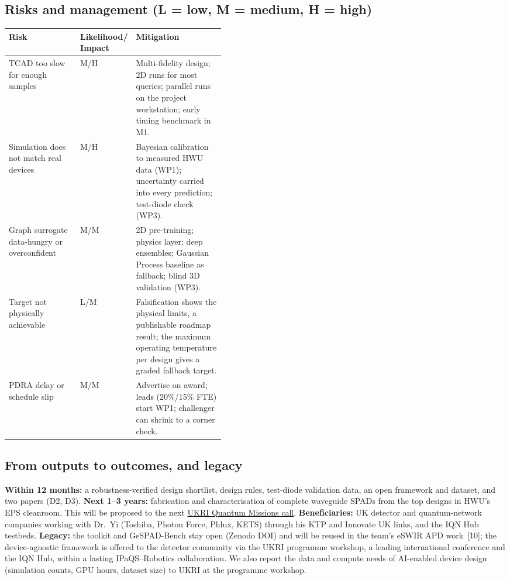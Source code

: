 \documentclass[11pt,a4paper]{article}
\newcommand{\cn}[1]{\textcolor{citeblue}{[#1]}}
\newcommand{\lnk}[2]{\href{#1}{\textcolor{citeblue}{#2}}}
\begin{document}
\subsection{Risks and management (L = low, M = medium, H = high)}
\begin{tabularx}{\linewidth}{@{}p{0.33\linewidth}p{0.095\linewidth}X@{}}\toprule
\small\textbf{Risk} & \small\textbf{Likelihood/ Impact} & \small\textbf{Mitigation}\\\midrule
\small TCAD too slow for enough samples & \small M/H & \small Multi-fidelity design; 2D runs for most queries; parallel runs on the project workstation; early timing benchmark in M1.\\
\small Simulation does not match real devices & \small M/H & \small Bayesian calibration to measured HWU data (WP1); uncertainty carried into every prediction; test-diode check (WP3).\\
\small Graph surrogate data-hungry or overconfident & \small M/M & \small 2D pre-training; physics layer; deep ensembles; Gaussian Process baseline as fallback; blind 3D validation (WP3).\\
\small Target not physically achievable & \small L/M & \small Falsification shows the physical limits, a publishable roadmap result; the maximum operating temperature per design gives a graded fallback target.\\
\small PDRA delay or schedule slip & \small M/M & \small Advertise on award; leads (20\%/15\% FTE) start WP1; challenger can shrink to a corner check.\\\bottomrule
\end{tabularx}

\subsection{From outputs to outcomes, and legacy}
\textbf{Within 12 months:} a robustness-verified design shortlist, design rules, test-diode validation data, an open framework and dataset, and two papers (D2, D3). \textbf{Next 1--3 years:} fabrication and characterisation of complete waveguide SPADs from the top designs in HWU's EPS cleanroom. This will be proposed to the next \lnk{https://www.ukri.org/opportunity/nqs-mission-2-components-systems-and-architectures/}{UKRI Quantum Missions call}. \textbf{Beneficiaries:} UK detector and quantum-network companies working with Dr.~Yi (Toshiba, Photon Force, Phlux, KETS) through his KTP and Innovate UK links, and the IQN Hub testbeds. \textbf{Legacy:} the toolkit and GeSPAD-Bench stay open (Zenodo DOI) and will be reused in the team's eSWIR APD work~\cn{10}; the device-agnostic framework is offered to the detector community via the UKRI programme workshop, a leading international conference and the IQN Hub, within a lasting IPaQS--Robotics collaboration. We also report the data and compute needs of AI-enabled device design (simulation counts, GPU hours, dataset size) to UKRI at the programme workshop.
\end{document}
